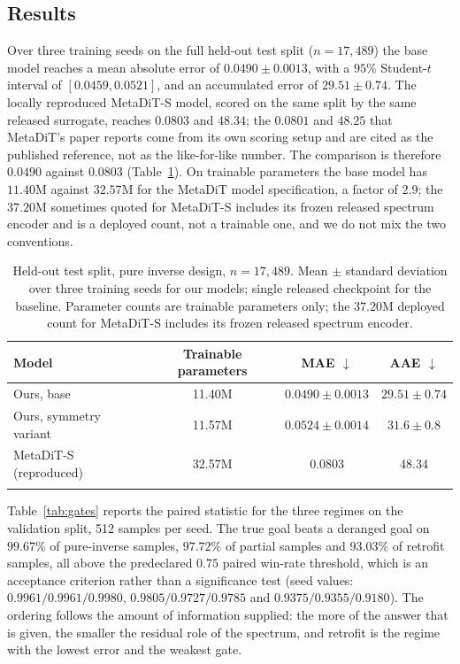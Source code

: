 \documentclass[pdflatex,oneside,sn-mathphys-num]{sn-jnl}
\theoremstyle{thmstyleone}
\theoremstyle{thmstyletwo}
\theoremstyle{thmstylethree}
\begin{document}
\subsection{Results}

Over three training seeds on the full held-out test split ($n=17{,}489$) the base model
reaches a mean absolute error of $0.0490\pm0.0013$, with a $95\%$ Student-$t$ interval of
$[0.0459,0.0521]$, and an accumulated error of $29.51\pm0.74$. The locally reproduced
MetaDiT-S model, scored on the same split by the same released surrogate, reaches $0.0803$
and $48.34$; the $0.0801$ and $48.25$ that MetaDiT's paper reports come from its own
scoring setup and are cited as the published reference, not as the like-for-like number.
The comparison is therefore $0.0490$ against $0.0803$ (Table~\ref{tab:benchmark}). On
trainable parameters the base model has $11.40$M against $32.57$M for the MetaDiT model
specification, a factor of $2.9$; the $37.20$M sometimes quoted for MetaDiT-S includes its
frozen released spectrum encoder and is a deployed count, not a trainable one, and we do
not mix the two conventions.

\begin{table}[h]
\centering
\caption{Held-out test split, pure inverse design, $n=17{,}489$. Mean $\pm$ standard
deviation over three training seeds for our models; single released checkpoint for the
baseline. Parameter counts are trainable parameters only; the $37.20$M deployed count for
MetaDiT-S includes its frozen released spectrum encoder.}
\label{tab:benchmark}
\begin{tabular}{@{}lccc@{}}
\toprule
Model & Trainable parameters & MAE $\downarrow$ & AAE $\downarrow$ \\
\midrule
Ours, base & 11.40M & $\mathbf{0.0490 \pm 0.0013}$ & $\mathbf{29.51 \pm 0.74}$ \\
Ours, symmetry variant & 11.57M & $0.0524 \pm 0.0014$ & $31.6 \pm 0.8$ \\
MetaDiT-S~\cite{metadit} (reproduced) & 32.57M & 0.0803 & 48.34 \\
\botrule
\end{tabular}
\end{table}

Table~\ref{tab:gates} reports the paired statistic for the three regimes on the
validation split, 512 samples per seed. The true goal beats a deranged goal on
$99.67\%$ of pure-inverse samples, $97.72\%$ of partial samples and $93.03\%$ of retrofit
samples, all above the predeclared $0.75$ paired win-rate threshold, which is an
acceptance criterion rather than a significance test (seed values: $0.9961/0.9961/0.9980$,
$0.9805/0.9727/0.9785$ and $0.9375/0.9355/0.9180$). The ordering follows the amount of information
supplied: the more of the answer that is given, the smaller the residual role of the
spectrum, and retrofit is the regime with the lowest error and the weakest gate.
\end{document}

